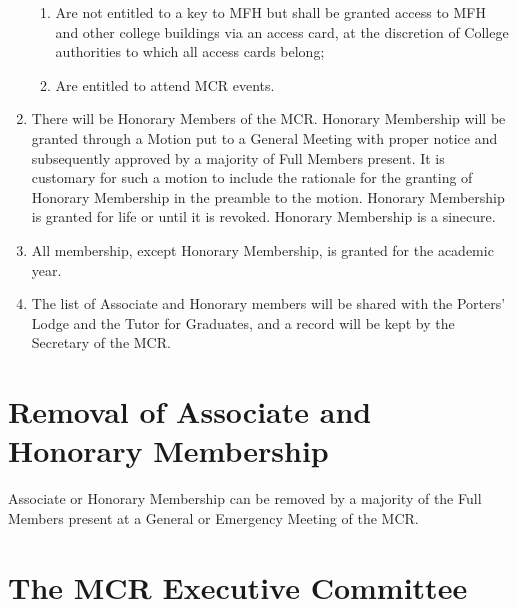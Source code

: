 \documentclass[11pt, a4paper]{article}
\begin{document}
\begin{enumerate}
\begin{enumerate}
      		\item Are not entitled to a key to MFH but shall be granted access to MFH and other college buildings via an access card, at the discretion of College authorities to which all access cards belong;
            \item Are entitled to attend MCR events.
		\end{enumerate}
     \item There will be Honorary Members of the MCR. Honorary Membership will be granted through a Motion put to a General Meeting with proper notice and subsequently approved by a majority of Full Members present. It is customary for such a motion to include the rationale for the granting of Honorary Membership in the preamble to the motion. Honorary Membership is granted for life or until it is revoked. Honorary Membership is a sinecure.
     \item All membership, except Honorary Membership, is granted for the academic year.
     \item The list of Associate and Honorary members will be shared with the Porters' Lodge and the Tutor for Graduates, and a record will be kept by the Secretary of the MCR.
\end{enumerate}





\section{Removal of Associate and Honorary Membership}
\label{sec:removal_member}

Associate or Honorary Membership can be removed by a majority of the Full Members present at a General or Emergency Meeting of the MCR.





\section{The MCR Executive Committee}
\label{sec:executive}
\end{document}
